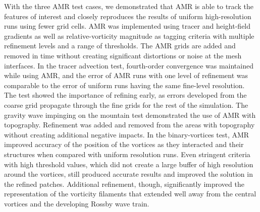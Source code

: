 With the three AMR test cases, we demonstrated that AMR is able to track
the features of interest and closely reproduces the results of uniform
high-resolution runs using fewer grid cells.  AMR was implemented using
tracer and height-field gradients as well as relative-vorticity
magnitude
as tagging criteria with multiple refinement levels and
a range of thresholds.  
The AMR grids are added and removed in time without creating significant
distortions or noise at the mesh interfaces.  In the tracer advection
test, fourth-order convergence was maintained while using AMR, and the
error of AMR runs with one level of refinement was comparable to the
error of uniform runs having the same fine-level resolution.  The test
showed the importance of refining early, as errors developed from the
coarse grid propagate through the fine grids for the rest of the
simulation.  The gravity wave impinging on the mountain test
demonstrated the use of AMR with topography.  Refinement was added and
removed from the areas with topography without creating additional
negative impacts.  In the binary-vortices test, AMR improved accuracy of
the position of the vortices as they interacted and their structures
when compared with uniform resolution runs.  Even stringent criteria 
with high threshold values, which did not create a large buffer of high resolution
around the vortices, still produced accurate results and improved the
solution in the refined patches.  Additional refinement, though,
significantly improved the representation of the vorticity filaments
that extended well away from the central vortices and the developing
Rossby wave train.


